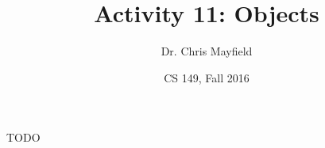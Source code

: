 \documentclass[12pt]{article}
\title{Activity 11: Objects}
\author{Dr. Chris Mayfield}
\date{CS 149, Fall 2016}
\begin{document}
\maketitle

TODO


\newpage

\newpage

\end{document}
